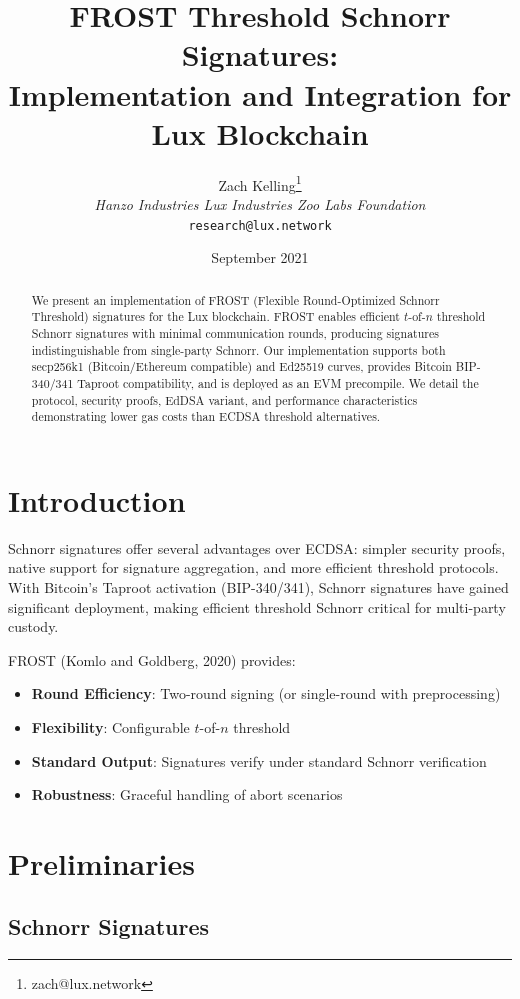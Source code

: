 \documentclass[11pt,a4paper]{article}
\title{\textbf{FROST Threshold Schnorr Signatures: \\Implementation and Integration for Lux Blockchain}}
\author{Zach Kelling\thanks{zach@lux.network} \\ \textit{Hanzo Industries \quad Lux Industries \quad Zoo Labs Foundation} \\ \texttt{research@lux.network}}
\date{September 2021}
\theoremstyle{definition}
\begin{document}
\maketitle

\begin{abstract}
We present an implementation of FROST (Flexible Round-Optimized Schnorr Threshold) signatures for the Lux blockchain. FROST enables efficient $t$-of-$n$ threshold Schnorr signatures with minimal communication rounds, producing signatures indistinguishable from single-party Schnorr. Our implementation supports both secp256k1 (Bitcoin/Ethereum compatible) and Ed25519 curves, provides Bitcoin BIP-340/341 Taproot compatibility, and is deployed as an EVM precompile. We detail the protocol, security proofs, EdDSA variant, and performance characteristics demonstrating lower gas costs than ECDSA threshold alternatives.
\end{abstract}

\section{Introduction}

Schnorr signatures offer several advantages over ECDSA: simpler security proofs, native support for signature aggregation, and more efficient threshold protocols. With Bitcoin's Taproot activation (BIP-340/341), Schnorr signatures have gained significant deployment, making efficient threshold Schnorr critical for multi-party custody.

FROST (Komlo and Goldberg, 2020) provides:

\begin{itemize}
\item \textbf{Round Efficiency}: Two-round signing (or single-round with preprocessing)
\item \textbf{Flexibility}: Configurable $t$-of-$n$ threshold
\item \textbf{Standard Output}: Signatures verify under standard Schnorr verification
\item \textbf{Robustness}: Graceful handling of abort scenarios
\end{itemize}

\section{Preliminaries}

\subsection{Schnorr Signatures}
\end{document}
